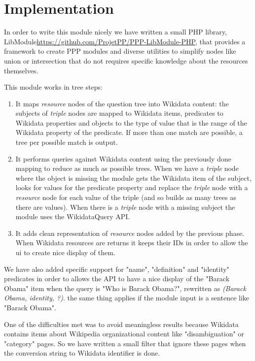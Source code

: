 \section{Implementation}
In order to write this module nicely we have written a small PHP library, LibModule\url{https://github.com/ProjetPP/PPP-LibModule-PHP}, that provides a framework to create PPP modules and diverse utilities to simplify nodes like union or intersection that do not requires specific knowledge about the resources themselves.

This module works in tree steps:
\begin{enumerate}
    \item It maps \textit{resource} nodes of the question tree into Wikidata content: the subjects of \textit{triple} nodes are mapped to Wikidata items, predicates to Wikidata properties and objects to the type of value that is the range of the Wikidata property of the predicate. If more than one match are possible, a tree per possible match is output.
    \item It performs queries against Wikidata content using the previously done mapping to reduce as much as possible trees. When we have a \textit{triple} node where the object is missing the module gets the Wikidata item of the subject, looks for values for the predicate property and replace the \textit{triple} node with a \textit{resource} node for each value of the triple (and so builds as many trees as there are values). When there is a \textit{triple} node with a missing subject the module uses the WikidataQuery API.
    \item It adds clean representation of \textit{resource} nodes added by the previous phase. When Wikidata resources are returns it keeps their IDs in order to allow the ui to create nice display of them.
\end{enumerate}

We have also added specific support for "name", "definition" and "identity" predicates in order to allows the API to have a nice display of the "Barack Obama" item when the query is "Who is Barack Obama?", rewritten as \textit{(Barack Obama, identity, ?)}. the same thing applies if the module input is a sentence like "Barack Obama".

One of the difficulties met was to avoid meaningless results because Wikidata contains items about Wikipedia organizational content like "disambiguation" or "category" pages. So we have written a small filter that ignore these pages when the conversion string to Wikidata identifier is done.

